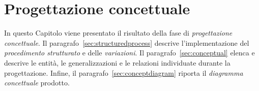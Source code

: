 \chapter{Progettazione concettuale}
In questo Capitolo viene presentato il risultato della fase di {\it progettazione concettuale}. Il
paragrafo~\vref{sec:structuredprocess} descrive l'implementazione del {\it procedimento strutturato} e
delle {\it variazioni}. Il paragrafo~\vref{sec:conceptual} elenca e descrive le entità,
le generalizzazioni e le relazioni individuate durante la progettazione. Infine, il
paragrafo~\vref{sec:conceptdiagram} riporta il {\it diagramma concettuale} prodotto.


%

